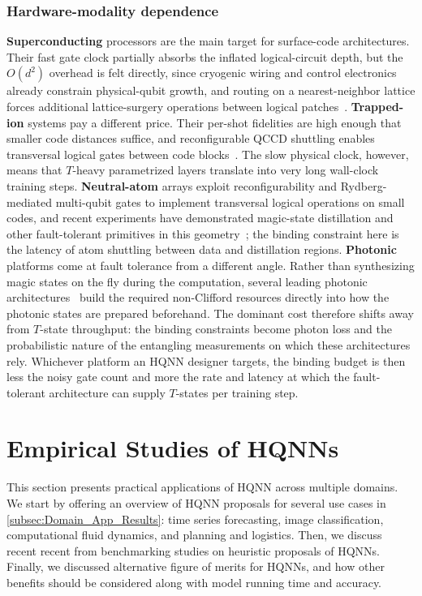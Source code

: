 \documentclass[aps,10pt,groupedaddress,prx,superscriptaddress,twocolumn,balancelastpage, tightenlines]{revtex4-2}
\theoremstyle{plain}  %
\begin{document}
\subsubsection{Hardware-modality dependence}
\textbf{Superconducting} processors are the main target for surface-code architectures. Their fast gate clock partially absorbs the inflated logical-circuit depth, but the $O(d^2)$ overhead is felt directly, since cryogenic wiring and control electronics already constrain physical-qubit growth, and routing on a nearest-neighbor lattice forces additional lattice-surgery operations between logical patches~\cite{litinski_game_2019}. \textbf{Trapped-ion} systems pay a different price. Their per-shot fidelities are high enough that smaller code distances suffice, and reconfigurable QCCD shuttling enables transversal logical gates between code blocks~\cite{decross2024computational}. The slow physical clock, however, means that $T$-heavy parametrized layers translate into very long wall-clock training steps. \textbf{Neutral-atom} arrays exploit reconfigurability and Rydberg-mediated multi-qubit gates to implement transversal logical operations on small codes, and recent experiments have demonstrated magic-state distillation and other fault-tolerant primitives in this geometry~\cite{bluvstein2024logical}; the binding constraint here is the latency of atom shuttling between data and distillation regions. 
\textbf{Photonic} platforms come at fault tolerance from a different angle. Rather than synthesizing magic states on the fly during the computation, several leading photonic architectures~\cite{bourassa2021blueprint, bartolucci_fusion_based_2023} build the required non-Clifford resources directly into how the photonic states are prepared beforehand. The dominant cost therefore shifts away from $T$-state throughput: the binding constraints become photon loss and the probabilistic nature of the entangling measurements on which these architectures rely. Whichever platform an \gls{HQNN} designer targets, the binding budget is then less the noisy gate count and more the rate and latency at which the fault-tolerant architecture can supply $T$-states per training step.





\section{Empirical Studies of HQNNs}
\label{sec:empirical}


This section presents practical applications of HQNN across multiple domains. We start by offering an overview of HQNN proposals for several use cases in \autoref{subsec:Domain_App_Results}: time series forecasting, image classification, computational fluid dynamics, and planning and logistics. Then, we discuss recent recent from benchmarking studies on heuristic proposals of HQNNs. Finally, we discussed alternative figure of merits for HQNNs, and how other benefits should be considered along with model running time and accuracy.
\end{document}
